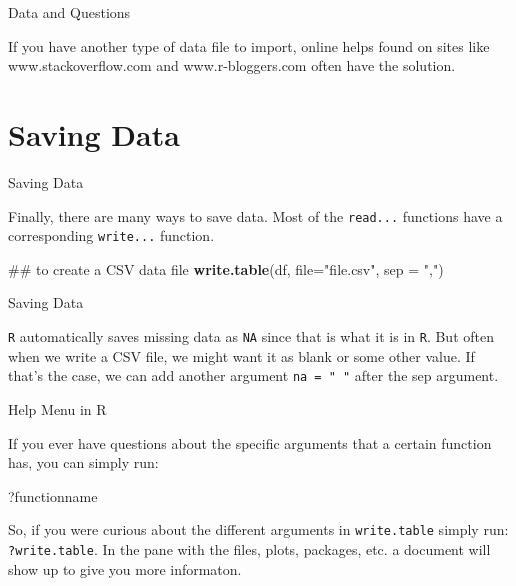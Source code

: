 \documentclass[ignorenonframetext,]{beamer}
\newenvironment{Shaded}{\begin{snugshade}}{\end{snugshade}}
\newcommand{\KeywordTok}[1]{\textcolor[rgb]{0.13,0.29,0.53}{\textbf{{#1}}}}
\newcommand{\DataTypeTok}[1]{\textcolor[rgb]{0.13,0.29,0.53}{{#1}}}
\newcommand{\StringTok}[1]{\textcolor[rgb]{0.31,0.60,0.02}{{#1}}}
\newcommand{\NormalTok}[1]{{#1}}
\begin{document}
\begin{frame}{Data and Questions}

If you have another type of data file to import, online helps found on
sites like www.stackoverflow.com and www.r-bloggers.com often have the
solution.

\end{frame}

\section{Saving Data}\label{saving-data}

\begin{frame}[fragile]{Saving Data}

Finally, there are many ways to save data. Most of the \texttt{read...}
functions have a corresponding \texttt{write...} function.

\begin{Shaded}
\begin{Highlighting}[]
\NormalTok{## to create a CSV data file}
\KeywordTok{write.table}\NormalTok{(df, }\DataTypeTok{file=}\StringTok{"file.csv"}\NormalTok{, }\DataTypeTok{sep =} \StringTok{","}\NormalTok{)}
\end{Highlighting}
\end{Shaded}

\end{frame}

\begin{frame}[fragile]{Saving Data}

\texttt{R} automatically saves missing data as \texttt{NA} since that is
what it is in \texttt{R}. But often when we write a CSV file, we might
want it as blank or some other value. If that's the case, we can add
another argument \texttt{na\ =\ "\ "} after the sep argument.

\end{frame}

\begin{frame}[fragile]{Help Menu in R}

If you ever have questions about the specific arguments that a certain
function has, you can simply run:

\begin{Shaded}
\begin{Highlighting}[]
\NormalTok{?functionname}
\end{Highlighting}
\end{Shaded}

So, if you were curious about the different arguments in
\texttt{write.table} simply run: \texttt{?write.table}. In the pane with
the files, plots, packages, etc. a document will show up to give you
more informaton.

\end{frame}
\end{document}

